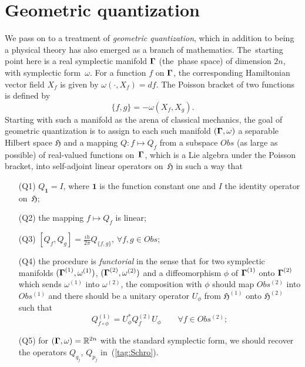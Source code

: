 \documentclass[11pt]{amsart}
\numberwithin{equation}{section}
\theoremstyle{remark}
\let\boldkey\mathbf \let\bold\mathbf
\newcommand\jedna{{\boldkey1}}
\newcommand\Obs{Obs}
\newcommand\Omg{{\bigam}}   %
\newcommand\HH{\mathfrak H}
\newcommand\RR{\mathbb R}
\newcommand{\bigam}{\mbox{\boldmath $\Gamma$}}
\begin{document}
\section{Geometric quantization}\label{sec2}
We pass on to a treatment of {\em geometric quantization\/}, which in addition
to being a physical theory has also emerged as a branch of mathematics.
The~starting point here is  a real symplectic manifold $\Omg$ (the~phase space)
of dimension $2n$, with symplectic form~$\omega$. For a function $f$ on $\Omg$,
the corresponding Hamiltonian vector field $X_f$ is given by
$\omega(\cdot,X_f)=df$. The Poisson bracket of two functions is defined by
\begin{equation}  \{f,g\} = -\omega(X_f,X_g).  \label{tag:PBG}  \end{equation}
Starting with such a manifold as the arena of classical mechanics, the goal of
geometric quantization is to assign to each such manifold $(\Omg,\omega)$ a
separable Hilbert space $\HH$ and a mapping $Q:f\mapsto Q_f$ from a subspace
$\Obs$ (as large as possible) of real-valued functions on~$\Omg$, which is a
Lie algebra under the Poisson bracket, into self-adjoint linear operators
on~$\HH$ in such a way that
\begin{enumerate}
\item[(Q1)] $Q_\jedna=I$, where $\jedna$ is the function constant one and $I$
the identity operator on~$\HH$;
\item[(Q2)] the mapping $f\mapsto Q_f$ is linear;
\item[(Q3)] $[Q_f,Q_g]=\frac{ih}{2\pi} Q_{\{f,g\}}$, \;\; $\forall f,g\in\Obs$;
\item[(Q4)] the procedure is {\sl functorial\/} in the sense that for two
symplectic manifolds $(\Omg^{(1)},\omega^{(1)})$, $(\Omg^{(2)},\omega^{(2)})$
and a diffeomorphism $\phi$ of $\Omg^{(1)}$ onto $\Omg^{(2)}$ which sends
$\omega^{(1)}$ into $\omega^{(2)}$, the composition with $\phi$ should map
$\Obs^{(2)}$ into $\Obs^{(1)}$ and there should be a unitary operator $U_\phi$
from $\HH^{(1)}$ onto $\HH^{(2)}$ such that
\begin{equation}  Q^{(1)}_{f\circ\phi} = U_\phi^* Q^{(2)}_f U_\phi \qquad
\forall f\in\Obs^{(2)} ;  \label{tag:COV}  \end{equation}
\item[(Q5)] for $(\Omg,\omega)=\RR^{2n}$ with the standard symplectic form, we
should recover the operators $Q_{q_j}$, $Q_{p_j}$ in~(\ref{tag:Schro}).
\end{enumerate}
\end{document}
